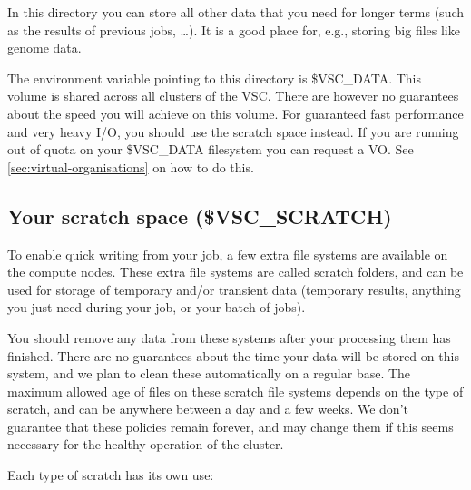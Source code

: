 In this directory you can store all other data that you need for longer terms
(such as the results of previous jobs, \ldots). It is a good place for, e.g.,
storing big files like genome data.

The environment variable pointing to this directory is \$VSC\_DATA.
This volume is shared across all
clusters of the VSC. There are however no guarantees about the
speed you will achieve on this volume. For guaranteed fast performance and very heavy I/O,
you should use the scratch space instead.
\ifgent
If you are running out of quota on your \$VSC\_DATA filesystem you can
request a VO. See \autoref{sec:virtual-organisations} on how to do this.
\fi

\subsection{Your scratch space (\$VSC\_SCRATCH)\label{subsec:scratch-directory}}

To enable quick writing from your job, a few extra file systems are available
on the compute nodes. These extra file systems are called scratch folders, and can
be used for storage of temporary and/or transient data (temporary results,
anything you just need during your job, or your batch of jobs).

You should remove any data from these systems after your processing them has
finished. There are no guarantees about the time your data will be stored on
this system, and we plan to clean these automatically on a regular base. The
maximum allowed age of files on these scratch file systems depends on the type
of scratch, and can be anywhere between a day and a few weeks. We don't
guarantee that these policies remain forever, and may change them if this seems
necessary for the healthy operation of the cluster.

Each type of scratch has its own use:

